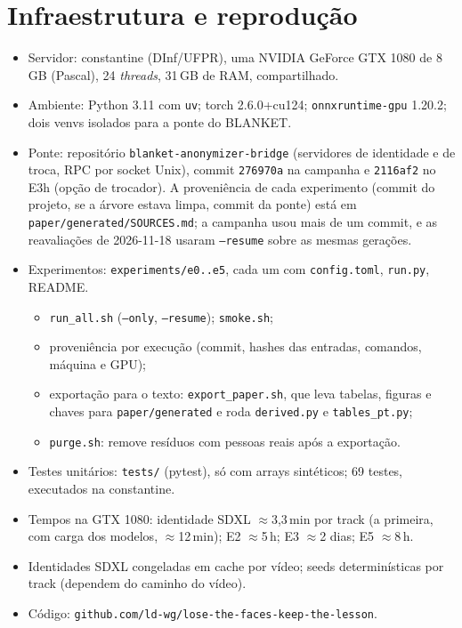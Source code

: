 \chapter{Infraestrutura e reprodução}
\label{ap:reproducao}

\begin{itemize}
\item Servidor: constantine (DInf/UFPR), uma NVIDIA GeForce GTX 1080 de 8\,GB (Pascal), 24 \emph{threads}, 31\,GB de RAM, compartilhado.
\item Ambiente: Python 3.11 com \texttt{uv}; torch 2.6.0+cu124; \texttt{onnxruntime-gpu} 1.20.2; dois venvs isolados para a ponte do BLANKET.
\item Ponte: repositório \texttt{blanket-anonymizer-bridge} (servidores de identidade e de troca, RPC por socket Unix), commit \texttt{276970a} na campanha e \texttt{2116af2} no E3h (opção de trocador). A proveniência de cada experimento (commit do projeto, se a árvore estava limpa, commit da ponte) está em \texttt{paper/generated/SOURCES.md}; a campanha usou mais de um commit, e as reavaliações de 2026-11-18 usaram \texttt{--resume} sobre as mesmas gerações.
\item Experimentos: \texttt{experiments/e0..e5}, cada um com \texttt{config.toml}, \texttt{run.py}, README.
  \begin{itemize}
  \item \texttt{run\_all.sh} (\texttt{--only}, \texttt{--resume}); \texttt{smoke.sh};
  \item proveniência por execução (commit, hashes das entradas, comandos, máquina e GPU);
  \item exportação para o texto: \texttt{export\_paper.sh}, que leva tabelas, figuras e chaves para \texttt{paper/generated} e roda \texttt{derived.py} e \texttt{tables\_pt.py};
  \item \texttt{purge.sh}: remove resíduos com pessoas reais após a exportação.
  \end{itemize}
\item Testes unitários: \texttt{tests/} (pytest), só com arrays sintéticos; 69 testes, executados na constantine.
\item Tempos na GTX 1080: identidade SDXL $\approx$3,3\,min por track (a primeira, com carga dos modelos, $\approx$12\,min); E2 $\approx$5\,h; E3 $\approx$2 dias; E5 $\approx$8\,h.
\item Identidades SDXL congeladas em cache por vídeo; seeds determinísticas por track (dependem do caminho do vídeo).
\item Código: \texttt{github.com/ld-wg/lose-the-faces-keep-the-lesson}.
\end{itemize}
